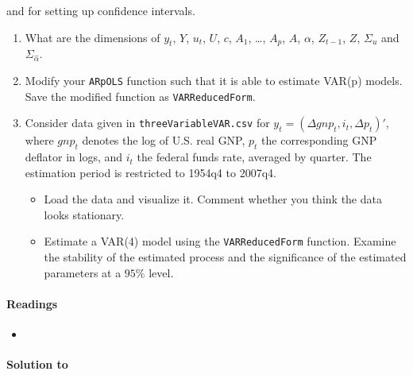  and for setting up confidence intervals.
\begin{enumerate}
\item What are the dimensions of \(y_t\), \(Y\), \(u_t\), \(U\), \(c\), \(A_1\), \ldots, \(A_p\), \(A\), \(\alpha \), \(Z_{t-1}\), \(Z\), \(\Sigma_u\) and \(\Sigma_{\hat{\alpha}}\).
\item Modify your \texttt{ARpOLS} function such that it is able to estimate VAR{(p)} models.
  Save the modified function as \texttt{VARReducedForm}.
\item Consider data given in \texttt{threeVariableVAR.csv} for \(y_t = (\Delta gnp_t,i_t,\Delta p_t)'\),
  where \(gnp_t\) denotes the log of U.S. real GNP,
  \(p_t\) the corresponding GNP deflator in logs,
  and \(i_t\) the federal funds rate, averaged by quarter.
The estimation period is restricted to 1954q4 to 2007q4. 
\begin{itemize}
	\item Load the data and visualize it. Comment whether you think the data looks stationary.
	\item Estimate a VAR{(4)} model using the \texttt{VARReducedForm} function.
	Examine the stability of the estimated process
	  and the significance of the estimated parameters at a \(95\% \) level.
\end{itemize}
\end{enumerate}

\paragraph{Readings}
\begin{itemize}
\item \textcite[Ch.~2.3]{Kilian.Lutkepohl_2017_StructuralVectorAutoregressive}
\end{itemize}

\begin{solution}\textbf{Solution to }
\ifDisplaySolutions

\fi
\newpage
\end{solution}